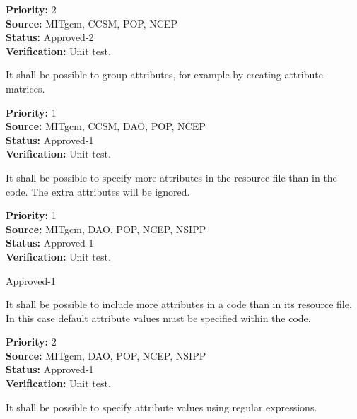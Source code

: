\begin{reqlist}
{\bf Priority:} 2 \\
{\bf Source:} MITgcm, CCSM, POP, NCEP \\
{\bf Status:} Approved-2 \\
{\bf Verification:} Unit test.
\end{reqlist}


It shall be possible to group attributes, for example by creating 
attribute matrices.

\begin{reqlist}
{\bf Priority:} 1 \\
{\bf Source:} MITgcm, CCSM, DAO, POP, NCEP \\
{\bf Status:} Approved-1 \\
{\bf Verification:} Unit test.
\end{reqlist}


It shall be possible to specify more attributes in the resource file 
than in the code.  The extra attributes will be ignored.

\begin{reqlist}
{\bf Priority:} 1 \\
{\bf Source:} MITgcm, DAO, POP, NCEP, NSIPP \\
{\bf Status:} Approved-1 \\ 
{\bf Verification:} Unit test.\\
\end{reqlist}
Approved-1


It shall be possible to include more attributes in a code than in its
resource file.  In this case default attribute values must be specified
within the code.

\begin{reqlist}
{\bf Priority:} 2 \\
{\bf Source:} MITgcm, DAO, POP, NCEP, NSIPP \\
{\bf Status:} Approved-1 \\ 
{\bf Verification:} Unit test.\\
\end{reqlist}


It shall be possible to specify attribute values using regular expressions.

